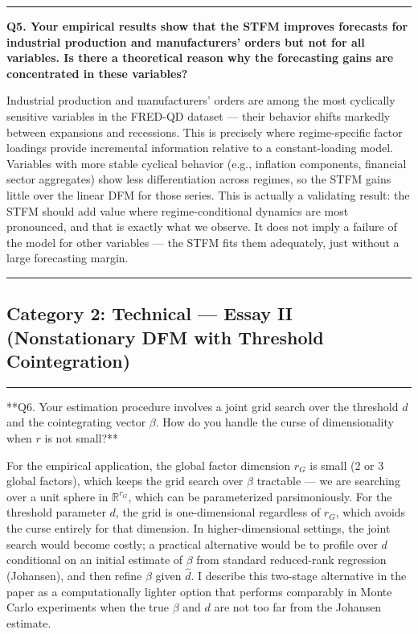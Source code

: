 \documentclass[11pt,a4paper]{article}
\begin{document}
\medskip\hrule\medskip

\textbf{Q5. Your empirical results show that the STFM improves forecasts for industrial production and manufacturers' orders but not for all variables. Is there a theoretical reason why the forecasting gains are concentrated in these variables?}

Industrial production and manufacturers' orders are among the most cyclically sensitive variables in the FRED-QD dataset — their behavior shifts markedly between expansions and recessions. This is precisely where regime-specific factor loadings provide incremental information relative to a constant-loading model. Variables with more stable cyclical behavior (e.g., inflation components, financial sector aggregates) show less differentiation across regimes, so the STFM gains little over the linear DFM for those series. This is actually a validating result: the STFM should add value where regime-conditional dynamics are most pronounced, and that is exactly what we observe. It does not imply a failure of the model for other variables — the STFM fits them adequately, just without a large forecasting margin.

\medskip\hrule\medskip

\subsection*{Category 2: Technical — Essay II (Nonstationary DFM with Threshold Cointegration)}

\medskip\hrule\medskip

**Q6. Your estimation procedure involves a joint grid search over the threshold $d$ and the cointegrating vector $\beta$. How do you handle the curse of dimensionality when $r$ is not small?**

For the empirical application, the global factor dimension $r_G$ is small (2 or 3 global factors), which keeps the grid search over $\beta$ tractable — we are searching over a unit sphere in $\mathbb{R}^{r_G}$, which can be parameterized parsimoniously. For the threshold parameter $d$, the grid is one-dimensional regardless of $r_G$, which avoids the curse entirely for that dimension. In higher-dimensional settings, the joint search would become costly; a practical alternative would be to profile over $d$ conditional on an initial estimate of $\beta$ from standard reduced-rank regression (Johansen), and then refine $\beta$ given $\hat{d}$. I describe this two-stage alternative in the paper as a computationally lighter option that performs comparably in Monte Carlo experiments when the true $\beta$ and $d$ are not too far from the Johansen estimate.
\end{document}
